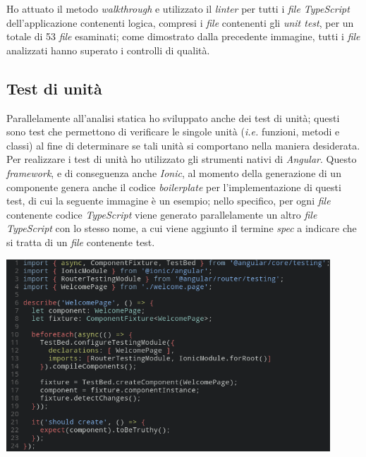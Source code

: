 Ho attuato il metodo \textit{walkthrough} e utilizzato il \textit{linter} per tutti i \textit{file TypeScript} dell'applicazione contenenti logica, compresi i \textit{file} contenenti gli \textit{unit test}, per un totale di 53 \textit{file} esaminati; come dimostrato dalla precedente immagine, tutti i \textit{file} analizzati hanno superato i controlli di qualità.

\subsection{Test di unità}

Parallelamente all'analisi statica ho sviluppato anche dei test di unità; questi sono test che permettono di verificare le singole unità (\textit{i.e.} funzioni, metodi e classi) al fine di determinare se tali unità si comportano nella maniera desiderata. \\
Per realizzare i test di unità ho utilizzato gli strumenti nativi di \textit{Angular}. Questo \textit{framework}, e di conseguenza anche \textit{Ionic}, al momento della generazione di un componente genera anche il codice \textit{boilerplate} per l'implementazione di questi test, di cui la seguente immagine è un esempio; nello specifico, per ogni \textit{file} contenente codice \textit{TypeScript} viene generato parallelamente un altro \textit{file TypeScript} con lo stesso nome, a cui viene aggiunto il termine \textit{spec} a indicare che si tratta di un \textit{file} contenente test. \\

\begin{minipage}{\linewidth}
  \centering
    \includegraphics[height=7.2cm]{immagini/jasminetest}
\end{minipage} \\

